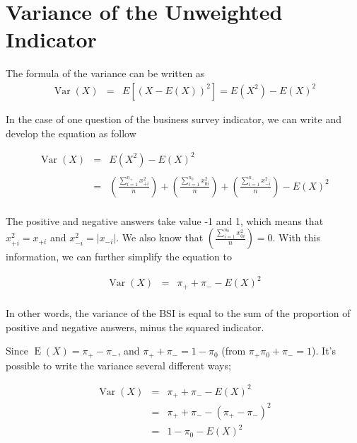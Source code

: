 \documentclass[12pt,a4paper,oneside]{book}
\DeclareMathOperator{\Var}{Var}
\DeclareMathOperator{\E}{E}
\begin{document}
\section{Variance of the Unweighted Indicator}

\nocite{alcaniz_calculation_2006}

The formula of the variance can be written as 
\begin{eqnarray}
         \Var(X) &=& E \left[ \left(X-E(X) \right)^2 \right] =  E\left( X^2\right) - E\left( X\right)^2
\end{eqnarray}

In the case of one question of the business survey indicator, we can write and develop the equation as follow

\begin{eqnarray}
\Var(X) &=&  E\left( X^2\right) - E\left( X\right)^2 \nonumber \\ \nonumber \\
    &=& \left( \frac{\sum_{i=1}^{n_+} x_{+i}^2}{n} \right)  + \left( \frac{\sum_{i=1}^{n_0} x_{0i}^2}{n} \right) + \left( \frac{\sum_{i=1}^{n_-} x_{-i}^2}{n} \right) - E(X)^2 \\ \nonumber 
\end{eqnarray}


The positive and negative answers take value -1 and 1, which means that $x_{+i}^2 = x_{+i}$ and $x_{-i}^2 = |x_{-i}|$. We also know that $\left( \frac{\sum_{i=1}^{n_0} x_{0i}^2}{n} \right) = 0$. 
With this information, we can further simplify the equation to

\begin{eqnarray}
	\Var(X) &=& \pi_+ + \pi_- - E ( X )^2 \label{var1} \\ \nonumber
\end{eqnarray}

In other words, the variance of the BSI is equal to the sum of the proportion of positive and negative answers, minus the squared indicator.

Since $\E(X)=\pi_+ - \pi_-$, and $\pi_+ + \pi_- = 1 - \pi_0$ (from $\pi_+ \pi_0 + \pi_- = 1$).
It's possible to write the variance several different ways;


\begin{eqnarray}
\Var(X) &=& \pi_+ + \pi_- - E ( X )^2  \nonumber \\
        &=& \pi_+ + \pi_- - ( \pi_+ - \pi_- )^2 \label{eq:var2} \\
	    &=& 1 - \pi_0 - E(X)^2 \label{eq:var3}
\end{eqnarray}
\end{document}
